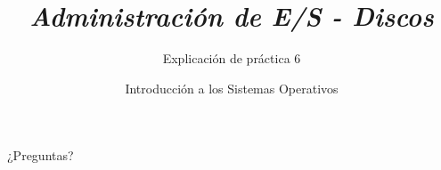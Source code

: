 


\author{Introducción a los Sistemas Operativos}



\title{\textit{Administración de E/S - Discos}}
\subtitle{Explicación de práctica 6}
\begin{frame}
  \titlepage
\end{frame}

\begin{frame}{}
  \begin{center}
    \vfill
    \huge ¿Preguntas?
    \vfill
  \end{center}
\end{frame}


